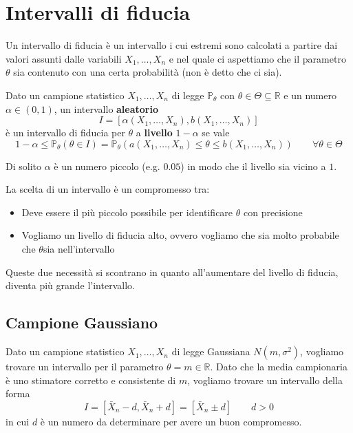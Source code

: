 \newpage
\section{Intervalli di fiducia}
Un intervallo di fiducia è un intervallo i cui estremi sono calcolati a partire dai valori assunti dalle variabili $X_1, \ldots, X_n$ e nel quale ci aspettiamo che il parametro $\theta$ sia contenuto con una certa probabilità (non è detto che ci sia).
\begin{definition}
	Dato un campione statistico $X_1, \ldots, X_n$ di legge $\mathbb{P}_\theta$ con $\theta \in \Theta \subseteq \mathbb{R}$ e un numero $\alpha \in (0,1)$, un intervallo \textbf{aleatorio}
	\begin{equation}
		I = [\alpha(X_1, \ldots, X_n), b(X_1, \ldots, X_n)]
	\end{equation}
	è un intervallo di fiducia per $\theta$ a \textbf{livello} $1-\alpha$ se vale
	\begin{equation}
		1-\alpha \leq \mathbb{P}_\theta(\theta \in I) = \mathbb{P}_\theta(a(X_1, \ldots, X_n) \leq \theta \leq b(X_1, \ldots, X_n)) \quad\quad \forall \theta \in \Theta
	\end{equation}
\end{definition}

\begin{note}
	Di solito $\alpha$ è un numero piccolo (e.g. $0.05$) in modo che il livello sia vicino a $1$.
\end{note}

\begin{observation}
	La scelta di un intervallo è un compromesso tra:
	\begin{itemize}
		\item Deve essere il più piccolo possibile per identificare $\theta$ con precisione
		\item Vogliamo un livello di fiducia alto, ovvero vogliamo che sia molto probabile che $\theta$sia nell'intervallo
	\end{itemize}
	Queste due necessità si scontrano in quanto all'aumentare del livello di fiducia, diventa più grande l'intervallo.
\end{observation}
\subsection{Campione Gaussiano}
Dato un campione statistico $X_1, \ldots, X_n$ di legge Gaussiana $N(m, \sigma^2)$, vogliamo trovare un intervallo per il parametro $\theta = m \in \mathbb{R}$. Dato che la media campionaria è uno stimatore corretto e consistente di $m$, vogliamo trovare un intervallo della forma
\begin{equation}
	I = [\bar{X}_n -d, \bar{X}_n + d] = [\bar{X}_n \pm d] \quad\quad d>0
\end{equation}
in cui $d$ è un numero da determinare per avere un buon compromesso.

